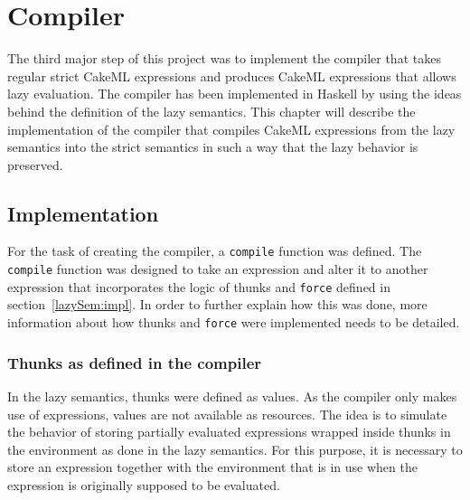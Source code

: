 \chapter{Compiler}
\label{chapter:compiler}
The third major step of this project was to implement the compiler that takes
regular strict CakeML expressions and produces CakeML expressions that allows
lazy evaluation. The compiler has been implemented in Haskell by using the ideas
behind the definition of the lazy semantics. This chapter will describe the
implementation of the compiler that compiles CakeML expressions from the lazy
semantics into the strict semantics in such a way that the lazy behavior
is preserved.

\section{Implementation}

For the task of creating the compiler, a \texttt{compile} function was defined.
The \texttt{compile} function was designed to take an expression and alter it to
another expression that incorporates the logic of thunks and \texttt{force} defined in
section~\ref{lazySem:impl}. In order to further explain how this was done,
more information about how thunks and \texttt{force} were implemented needs to
be detailed.

\subsection{Thunks as defined in the compiler}
\label{comp:thunk}
In the lazy semantics, thunks were defined as values. As the compiler only makes
use of expressions, values are not available as resources.
The idea is to simulate the behavior of storing partially evaluated expressions
wrapped inside thunks in the environment as done in the lazy semantics.
For this purpose, it is necessary to store an expression
together with the environment that is in use when the expression is originally
supposed to be evaluated.

